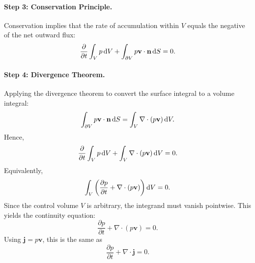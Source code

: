 \paragraph{Step 3: Conservation Principle.}  
Conservation implies that the rate of accumulation within $V$ equals the negative of the net outward flux:
\[
\frac{\partial}{\partial t} \int_V p \mathop{}\!\mathrm{d} V + \int_{\partial V} p \mathbf{v} \cdot \mathbf{n} \mathop{}\!\mathrm{d} S = 0.
\]

\paragraph{Step 4: Divergence Theorem.}  
Applying the divergence theorem to convert the surface integral to a volume integral:
\[
\int_{\partial V} p \mathbf{v} \cdot \mathbf{n} \mathop{}\!\mathrm{d} S = \int_V \nabla \cdot (p \mathbf{v}) \mathop{}\!\mathrm{d} V.
\]
Hence,
\[
\frac{\partial}{\partial t} \int_V p \mathop{}\!\mathrm{d} V + \int_V \nabla \cdot (p \mathbf{v}) \mathop{}\!\mathrm{d} V = 0.
\]
Equivalently,
\[
\int_V \left(\frac{\partial p}{\partial t}+\nabla\cdot(p\mathbf{v})\right)\mathop{}\!\mathrm{d} V=0.
\]
Since the control volume $V$ is arbitrary, the integrand must vanish pointwise. This yields the continuity equation:
\[
\frac{\partial p}{\partial t}+\nabla\cdot(p\mathbf{v})=0.
\]
Using $\mathbf{j}=p\mathbf{v}$, this is the same as
\[
\frac{\partial p}{\partial t}+\nabla\cdot\mathbf{j}=0.
\]


